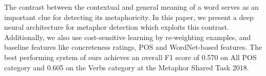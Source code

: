 The contrast between the contextual and general meaning of a word serves as an important clue for detecting its metaphoricity. In this paper, we present a deep neural architecture for metaphor detection which exploits this contrast. Additionally, we also use cost-sensitive learning by re-weighting examples, and baseline features like concreteness ratings, POS and WordNet-based features. The best performing system of ours achieves an overall F1 score of 0.570 on All POS category and 0.605 on the Verbs category at the Metaphor Shared Task 2018.
